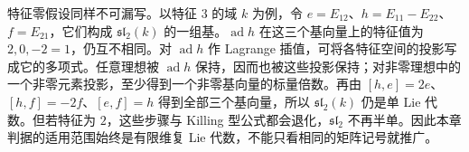 特征零假设同样不可漏写。以特征 \(3\) 的域 \(k\) 为例，令 \(e=E_{12}\)、\(h=E_{11}-E_{22}\)、\(f=E_{21}\)，它们构成 \(\mathfrak{sl}_2(k)\) 的一组基。\(\operatorname{ad}h\) 在这三个基向量上的特征值为 \(2,0,-2=1\)，仍互不相同。对 \(\operatorname{ad}h\) 作 Lagrange 插值，可将各特征空间的投影写成它的多项式。任意理想被 \(\operatorname{ad}h\) 保持，因而也被这些投影保持；对非零理想中的一个非零元素投影，至少得到一个非零基向量的标量倍数。再由 \([h,e]=2e\)、\([h,f]=-2f\)、\([e,f]=h\) 得到全部三个基向量，所以 \(\mathfrak{sl}_2(k)\) 仍是单 Lie 代数。但若特征为 \(2\)，这些步骤与 Killing 型公式都会退化，\(\mathfrak{sl}_2\) 不再半单。因此本章判据的适用范围始终是有限维复 Lie 代数，不能只看相同的矩阵记号就推广。
